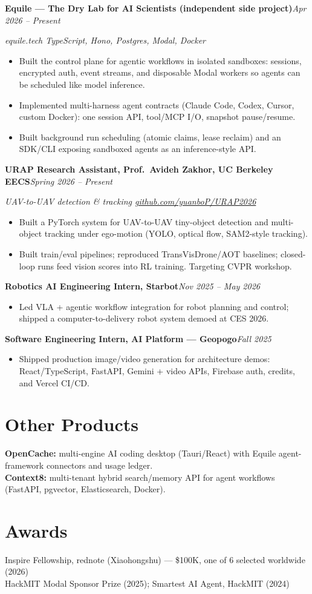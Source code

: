 \documentclass[10pt, letterpaper]{article}
\newcommand{\role}[2]{%
  \vspace{3pt}%
  \noindent\textbf{#1}\hfill\textit{#2}\par
}
\newcommand{\rolesub}[1]{%
  \noindent\textit{#1}\par\vspace{1pt}%
}
\begin{document}
\role{Equile --- The Dry Lab for AI Scientists (independent side project)}{Apr 2026 -- Present}
\rolesub{equile.tech \quad TypeScript, Hono, Postgres, Modal, Docker}
\begin{itemize}
  \item Built the control plane for agentic workflows in isolated sandboxes: sessions, encrypted auth, event streams, and disposable Modal workers so agents can be scheduled like model inference.
  \item Implemented multi-harness agent contracts (Claude Code, Codex, Cursor, custom Docker): one session API, tool/MCP I/O, snapshot pause/resume.
  \item Built background run scheduling (atomic claims, lease reclaim) and an SDK/CLI exposing sandboxed agents as an inference-style API.
\end{itemize}

\role{URAP Research Assistant, Prof.\ Avideh Zakhor, UC Berkeley EECS}{Spring 2026 -- Present}
\rolesub{UAV-to-UAV detection \& tracking \quad \href{https://github.com/yuanboP/URAP2026}{github.com/yuanboP/URAP2026}}
\begin{itemize}
  \item Built a PyTorch system for UAV-to-UAV tiny-object detection and multi-object tracking under ego-motion (YOLO, optical flow, SAM2-style tracking).
  \item Built train/eval pipelines; reproduced TransVisDrone/AOT baselines; closed-loop runs feed vision scores into RL training. Targeting CVPR workshop.
\end{itemize}

\role{Robotics AI Engineering Intern, Starbot}{Nov 2025 -- May 2026}
\begin{itemize}
  \item Led VLA + agentic workflow integration for robot planning and control; shipped a computer-to-delivery robot system demoed at CES 2026.
\end{itemize}

\role{Software Engineering Intern, AI Platform --- Geopogo}{Fall 2025}
\begin{itemize}
  \item Shipped production image/video generation for architecture demos: React/TypeScript, FastAPI, Gemini + video APIs, Firebase auth, credits, and Vercel CI/CD.
\end{itemize}

\section{Other Products}
\textbf{OpenCache:} multi-engine AI coding desktop (Tauri/React) with Equile agent-framework connectors and usage ledger.\\[2pt]
\textbf{Context8:} multi-tenant hybrid search/memory API for agent workflows (FastAPI, pgvector, Elasticsearch, Docker).

\section{Awards}
Inspire Fellowship, rednote (Xiaohongshu) --- \$100K, one of 6 selected worldwide (2026)\\[1pt]
HackMIT Modal Sponsor Prize (2025); Smartest AI Agent, HackMIT (2024)
\end{document}
